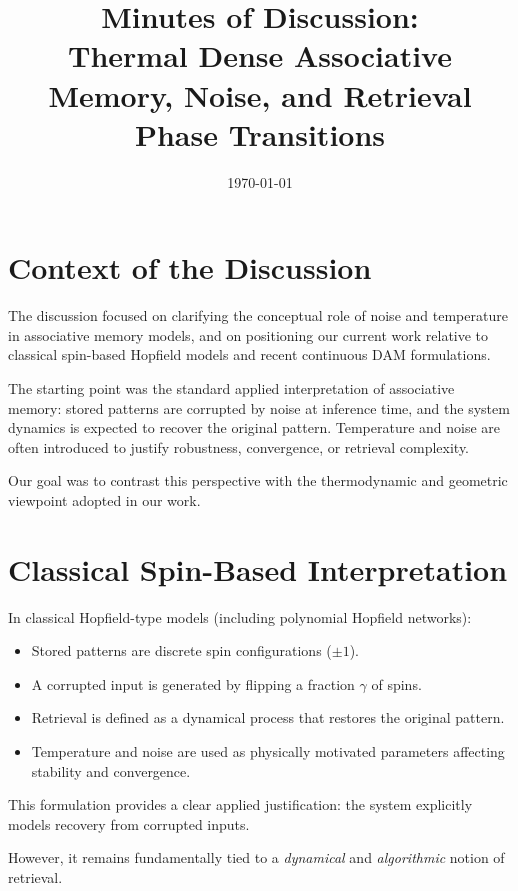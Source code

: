 \documentclass[11pt,a4paper]{article}
\title{Minutes of Discussion:\\
Thermal Dense Associative Memory, Noise, and Retrieval Phase Transitions}
\author{}
\date{\today}
\begin{document}
\maketitle

\section*{Context of the Discussion}

The discussion focused on clarifying the conceptual role of noise and temperature in associative memory models, and on positioning our current work relative to classical spin-based Hopfield models and recent continuous DAM formulations.

The starting point was the standard applied interpretation of associative memory: stored patterns are corrupted by noise at inference time, and the system dynamics is expected to recover the original pattern. Temperature and noise are often introduced to justify robustness, convergence, or retrieval complexity.

Our goal was to contrast this perspective with the thermodynamic and geometric viewpoint adopted in our work.

\section{Classical Spin-Based Interpretation}

In classical Hopfield-type models (including polynomial Hopfield networks):

\begin{itemize}
    \item Stored patterns are discrete spin configurations ($\pm 1$).
    \item A corrupted input is generated by flipping a fraction $\gamma$ of spins.
    \item Retrieval is defined as a dynamical process that restores the original pattern.
    \item Temperature and noise are used as physically motivated parameters affecting stability and convergence.
\end{itemize}

This formulation provides a clear applied justification: the system explicitly models recovery from corrupted inputs.

However, it remains fundamentally tied to a \emph{dynamical} and \emph{algorithmic} notion of retrieval.
\end{document}
